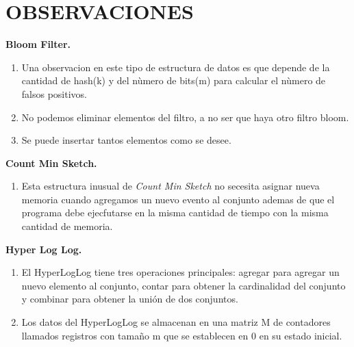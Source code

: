 \documentclass[journal]{IEEEtran}
\begin{document}
\section{OBSERVACIONES} 
\textbf{Bloom Filter. }
\begin{enumerate}
\item Una observacion en este tipo de estructura de datos es que depende de la cantidad de hash(k) y del nùmero de bits(m) para calcular el nùmero de falsos positivos.
\item No podemos eliminar elementos del filtro, a no ser que haya otro filtro bloom.
\item Se puede insertar tantos elementos como se desee.
\end{enumerate}
\textbf{Count Min Sketch. }
\begin{enumerate}
\item Esta estructura inusual de \textit{Count Min Sketch } no secesita asignar nueva memoria cuando agregamos un nuevo evento al conjunto ademas de que el programa debe ejecfutarse en la misma cantidad de tiempo con la misma cantidad de memoria.\\
\end{enumerate}
\textbf{Hyper Log Log. }
\begin{enumerate}
\item El HyperLogLog tiene tres operaciones principales: agregar para agregar un nuevo elemento al conjunto, contar para obtener la cardinalidad del conjunto y combinar para obtener la unión de dos conjuntos.
\item Los datos del HyperLogLog se almacenan en una matriz M de contadores llamados registros con tamaño m que se establecen en 0 en su estado inicial.
\end{enumerate}
\end{document}
